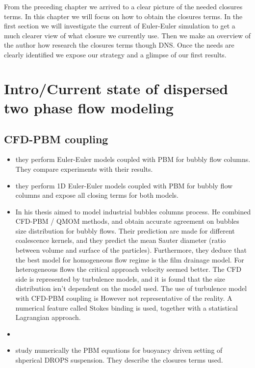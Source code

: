 
From the preceding chapter we arrived to a clear picture of the needed closures terms.
In this chapter we will focus on how to obtain the closures terms. 
In the first section we will investigate the current of Euler-Euler simulation to get a much clearer view of what closure we currently use.
Then we make an overview of the author how research the closures terms though DNS. 
Once the needs are clearly identified we expose our strategy and a glimpse of our first results.

\section{Intro/Current state of dispersed two phase flow  modeling}
\subsection{CFD-PBM coupling}
\begin{itemize}
    \item \citet{morel2010comparison} they perform Euler-Euler models coupled with PBM for bubbly flow columns. 
    They compare experiments with their results.
    \item \citet{sporleder2012population} they perform 1D Euler-Euler models coupled with PBM for bubbly flow columns and expose all closing terms for both models. 
    \item In his thesis \citet{gemello2018modelling} aimed to model industrial bubbles columns process. 
    He combined CFD-PBM / QMOM methods, and obtain accurate agreement on bubbles size distribution for bubbly flows.
    Their prediction are made for different coalescence kernels, and they predict the mean Sauter diameter (ratio between volume and surface of the particles). 
    Furthermore, they deduce that the best model for homogeneous flow regime is the film drainage model. 
    For heterogeneous flows the critical approach velocity seemed better.
    The CFD side is represented by turbulence models, and it is found that the size distribution isn't dependent on the model used. 
    The use of turbulence model with CFD-PBM coupling is However not representative of the reality. 
    A numerical feature called Stokes binding is used, together with a statistical Lagrangian approach. 
    \item \citet{alam2022cfd}
    \item \citet{wang1995simultaneous} study numerically the PBM equations for buoyancy driven setting of shperical DROPS suspension.
    They describe the closures terms used.  
\end{itemize}
